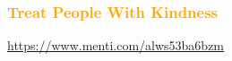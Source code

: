 \documentclass[parskip,12pt]{beamer}
\begin{document}
\begin{frame}
\frametitle{\textcolor{orange}{Treat People With Kindness}}
\vspace{-3mm}
\url{https://www.menti.com/alws53ba6bzm}
\end{frame}
  
\end{document}
